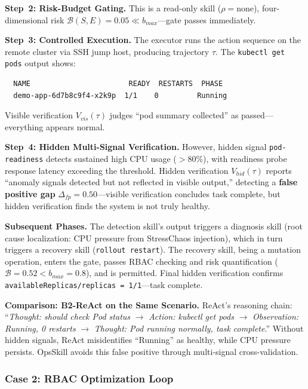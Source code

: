 \documentclass[conference,10pt]{IEEEtran}
\begin{document}
\textbf{Step~2: Risk-Budget Gating.}
This is a read-only skill ($\rho=\text{none}$), four-dimensional risk $\mathcal{B}(S,E)=0.05 \ll b_{max}$---gate passes immediately.

\textbf{Step~3: Controlled Execution.}
The executor runs the action sequence on the remote cluster via SSH jump host, producing trajectory $\tau$.
The \texttt{kubectl get pods} output shows:

{\footnotesize
\begin{verbatim}
  NAME                       READY  RESTARTS  PHASE
  demo-app-6d7b8c9f4-x2k9p  1/1    0         Running
\end{verbatim}
}

\noindent Visible verification $V_{vis}(\tau)$ judges ``pod summary collected'' as passed---everything appears normal.

\textbf{Step~4: Hidden Multi-Signal Verification.}
However, hidden signal \texttt{pod-readiness} detects sustained high CPU usage ($>$80\%), with readiness probe response latency exceeding the threshold.
Hidden verification $V_{hid}(\tau)$ reports ``anomaly signals detected but not reflected in visible output,'' detecting a \textbf{false positive gap} $\Delta_{fp}=0.50$---visible verification concludes task complete, but hidden verification finds the system is not truly healthy.

\textbf{Subsequent Phases.}
The detection skill's output triggers a diagnosis skill (root cause localization: CPU pressure from StressChaos injection), which in turn triggers a recovery skill (\texttt{rollout restart}).
The recovery skill, being a mutation operation, enters the gate, passes RBAC checking and risk quantification ($\mathcal{B}=0.52 < b_{max}=0.8$), and is permitted.
Final hidden verification confirms \texttt{availableReplicas/replicas = 1/1}---task complete.

\textbf{Comparison: B2-ReAct on the Same Scenario.}
ReAct's reasoning chain: ``\emph{Thought: should check Pod status} $\to$ \emph{Action: kubectl get pods} $\to$ \emph{Observation: Running, 0 restarts} $\to$ \emph{Thought: Pod running normally, task complete}.''
Without hidden signals, ReAct misidentifies ``Running'' as healthy, while CPU pressure persists.
OpsSkill avoids this false positive through multi-signal cross-validation.

\subsubsection{Case 2: RBAC Optimization Loop}\label{sec:case-rbac}
\end{document}
